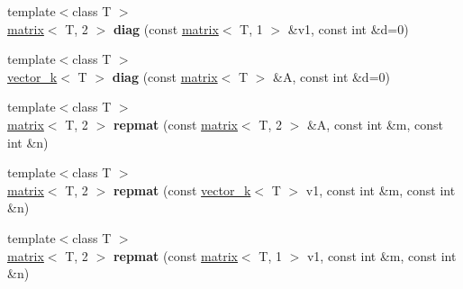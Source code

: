 \begin{DoxyCompactItemize}
\item 
\hypertarget{namespacekeycpp_ab2e8fc8dec82325b5f9245fae02954f7}{{\footnotesize template$<$class T $>$ }\\\hyperlink{classkeycpp_1_1matrix}{matrix}$<$ T, 2 $>$ {\bfseries diag} (const \hyperlink{classkeycpp_1_1matrix}{matrix}$<$ T, 1 $>$ \&v1, const int \&d=0)}\label{namespacekeycpp_ab2e8fc8dec82325b5f9245fae02954f7}

\item 
\hypertarget{namespacekeycpp_a282ba9ffa45fecd5880534415b116cc6}{{\footnotesize template$<$class T $>$ }\\\hyperlink{classkeycpp_1_1vector__k}{vector\-\_\-k}$<$ T $>$ {\bfseries diag} (const \hyperlink{classkeycpp_1_1matrix}{matrix}$<$ T $>$ \&A, const int \&d=0)}\label{namespacekeycpp_a282ba9ffa45fecd5880534415b116cc6}

\item 
\hypertarget{namespacekeycpp_a7dec07979cca186806a17250b2cb50aa}{{\footnotesize template$<$class T $>$ }\\\hyperlink{classkeycpp_1_1matrix}{matrix}$<$ T, 2 $>$ {\bfseries repmat} (const \hyperlink{classkeycpp_1_1matrix}{matrix}$<$ T, 2 $>$ \&A, const int \&m, const int \&n)}\label{namespacekeycpp_a7dec07979cca186806a17250b2cb50aa}

\item 
\hypertarget{namespacekeycpp_aae354f0a4b26f5e5cc4158e193ab23ea}{{\footnotesize template$<$class T $>$ }\\\hyperlink{classkeycpp_1_1matrix}{matrix}$<$ T, 2 $>$ {\bfseries repmat} (const \hyperlink{classkeycpp_1_1vector__k}{vector\-\_\-k}$<$ T $>$ v1, const int \&m, const int \&n)}\label{namespacekeycpp_aae354f0a4b26f5e5cc4158e193ab23ea}

\item 
\hypertarget{namespacekeycpp_a1f555c6d461fb102bc95d6cbefa5528e}{{\footnotesize template$<$class T $>$ }\\\hyperlink{classkeycpp_1_1matrix}{matrix}$<$ T, 2 $>$ {\bfseries repmat} (const \hyperlink{classkeycpp_1_1matrix}{matrix}$<$ T, 1 $>$ v1, const int \&m, const int \&n)}\label{namespacekeycpp_a1f555c6d461fb102bc95d6cbefa5528e}


\end{DoxyCompactItemize}
